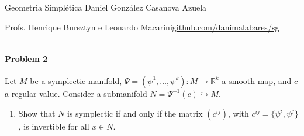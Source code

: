 \clearpage

\begin{minipage}{\textwidth}
	\begin{minipage}{1\textwidth}
		Geometria Simpl\'etica \hfill Daniel González Casanova Azuela
		
		{\small Profs. Henrique Bursztyn e Leonardo Macarini\hfill\href{https://github.com/danimalabares/sg}{github.com/danimalabares/sg}}
	\end{minipage}
\end{minipage}\vspace{.2cm}\hrule

\vspace{10pt}
\paragraph{Problem 2} Let $M$ be a symplectic manifold, $\Psi=(\psi^1,\ldots,\psi^k):M\to \mathbb{R}^{k}$ a smooth map, and $c$ a regular value. Consider a submanifold $N=\Psi^{-1}(c)\hookrightarrow M$.
\begin{enumerate}[label=\alph*.]
	
	\item[b.] Show that $N$ is symplectic if and only if the matrix $(c^{ij})$, with $c^{ij}=\{\psi^i,\psi^j\}$, is invertible for all $x\in N$.\end{enumerate}

